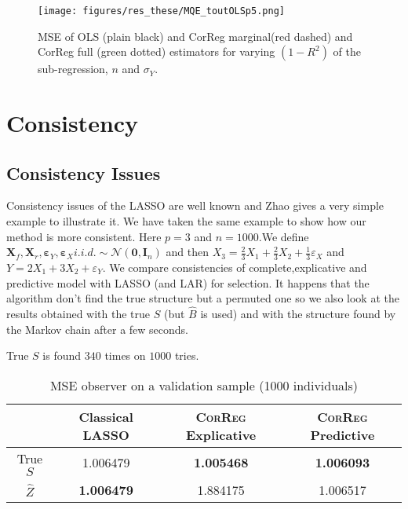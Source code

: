 \documentclass[11pt,a4paper]{report}
\begin{document}
	
\begin{figure}[h!]
	\texttt{[image: figures/res\_these/MQE\_toutOLSp5.png]}\label{MQE2}
	\caption{MSE of OLS (plain black) and CorReg marginal(red dashed) and CorReg full (green dotted) estimators for varying $(1-R^2)$ of the sub-regression, $n$ and $\sigma_Y$.}
\end{figure}	
	
	\section{Consistency}
		\subsection{Consistency Issues}\label{consistency}
		Consistency issues of the LASSO are well known and Zhao \cite{Zhao2006MSC} gives a very simple example to illustrate it.
		We have taken the same example to show how our method is more consistent.
		Here $p=3$ and $n=1000$.We define $\boldsymbol{X}_f,\boldsymbol{X}_r,\boldsymbol{\varepsilon}_Y,\boldsymbol{\varepsilon}_{X} i.i.d. \sim \mathcal{N}(\boldsymbol{0},\boldsymbol{I}_n)$ and then $X_3=\frac{2}{3}X_1+\frac{2}{3}X_2+\frac{1}{3}\varepsilon_X$ and $Y=2X_1+3X_2+\varepsilon_Y$.
		We compare consistencies of complete,explicative and predictive model with LASSO (and LAR) for selection.
		It happens that the algorithm don't find the true structure but a permuted one so we also look at the results obtained with the true $S$ (but $\hat{B}$ is used) and with the structure found by the Markov chain after a few seconds.
		
		True $S$ is found $340$ times on $1000$ tries.
		
		\begin{table}[h!]
		\centering
		\begin{tabular}{|c|c|c|c|}
		\hline 
		 & Classical LASSO & \textsc{CorReg} Explicative & \textsc{CorReg} Predictive \\ 
		\hline 
		True $S$ &  1.006479 & \textbf{1.005468} & \textbf{1.006093} \\ 
		\hline 
		$\hat{Z}$ & \textbf{1.006479} & 1.884175 & 1.006517 \\ 
		\hline 
		\end{tabular} 
		\caption{MSE observer on a validation sample (1000 individuals)}
		\end{table}
\end{document}
